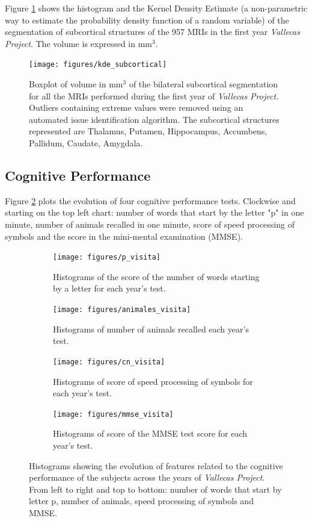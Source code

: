 \documentclass[11pt]{article}
\theoremstyle{definition}
\theoremstyle{remark}
\begin{document}
Figure \ref{fig:kde_subcortical} shows the histogram and the Kernel Density Estimate (a non-parametric way to estimate the probability density function of a random variable) of the segmentation of subcortical structures of the 957 MRIs in the first year \emph{Vallecas Project}. The volume is expressed in mm${^3}$.
\begin{figure}[H]
        \centering
        \texttt{[image: figures/kde\_subcortical]}
        \caption{Boxplot of volume in mm${^3}$ of the bilateral subcortical segmentation for all the MRIs performed during the first year of \emph{Vallecas Project}. Outliers containing extreme values were removed using an automated issue identification algorithm. The subcortical structures represented are Thalamus, Putamen, Hippocampus, Accumbens, Pallidum, Caudate, Amygdala.} 
        \label{fig:kde_subcortical}
\end{figure}

\subsection{Cognitive Performance}
\label{sse:cogper}
Figure \ref{fig:cogperyears} plots the evolution of four cognitive performance tests. Clockwise and starting on  the top left chart: number of words that start by the letter "p" in one minute, number of animals recalled in one minute, score of speed processing of symbols and the score in the mini-mental examination (MMSE). 

\begin{figure}[H]
    \centering
    \begin{subfigure}[t]{0.4\textwidth}
        \centering
        \texttt{[image: figures/p\_visita]}
        \caption{Histograms of the score of the number of words starting by a letter for each year's test.}
    \end{subfigure}
    \hfill
    \begin{subfigure}[t]{0.4\textwidth}
        \centering
        \texttt{[image: figures/animales\_visita]}
        \caption{Histograms of number of animals recalled each year's test.}
    \end{subfigure}%
    
     \begin{subfigure}[t]{0.4\textwidth}
        \centering
        \texttt{[image: figures/cn\_visita]}
        \caption{Histograms of score of speed processing of symbols for each year's test.}
    \end{subfigure}
    \hfill
    \begin{subfigure}[t]{0.4\textwidth}
        \centering
        \texttt{[image: figures/mmse\_visita]}
        \caption{Histograms of score of the MMSE test score for each year's test.}
    \end{subfigure}%
   
    \caption{Histograms showing the evolution of features related to the cognitive performance of the subjects across the years of \emph{Vallecas Project}. From left to right and top to bottom: number of words that start by letter p, number of animals, speed processing of symbols and MMSE.}
    \label{fig:cogperyears}
\end{figure}
\end{document}
